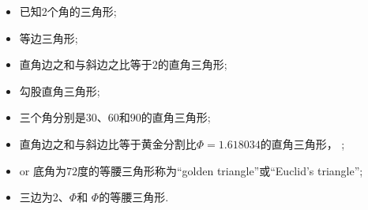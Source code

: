 \documentclass[../main.tex]{subfiles}
\begin{document}
\begin{itemize}
\item {}已知2个角的三角形;

\item {}等边三角形;

\item {}直角边之和与斜边之比等于$2$的直角三角形;

\item {} 勾股直角三角形;

\item {} 三个角分别是$30$、$60$和$90$的直角三角形;

\item {}直角边之和与斜边比等于黄金分割比$\Phi=1.618034$的直角三角形，
;

\item {} or 
底角为$72$度的等腰三角形称为\enquote{golden triangle}或\enquote{Euclid's triangle};

\item {} 三边为$2$、$\Phi$和 $\Phi$的等腰三角形.
\end{itemize}
\end{document}
